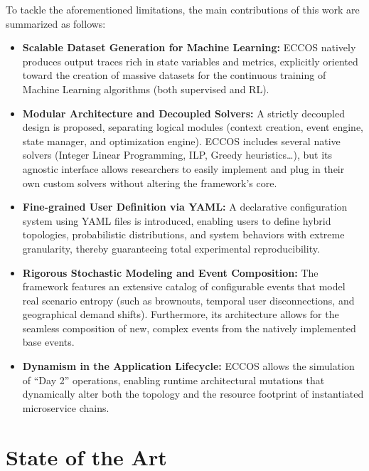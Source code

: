 \documentclass[ASNA]{USG} %
\begin{document}
To tackle the aforementioned limitations, the main contributions of this work are summarized as follows:

\begin{itemize}
    \item \textbf{Scalable Dataset Generation for Machine Learning:} ECCOS natively produces output traces rich in state variables and metrics, explicitly oriented toward the creation of massive datasets for the continuous training of Machine Learning algorithms (both supervised and RL).
    \item \textbf{Modular Architecture and Decoupled Solvers:} A strictly decoupled design is proposed, separating logical modules (context creation, event engine, state manager, and optimization engine). ECCOS includes several native solvers (Integer Linear Programming, ILP, Greedy heuristics\ldots), but its agnostic interface allows researchers to easily implement and plug in their own custom solvers without altering the framework's core.
    \item \textbf{Fine-grained User Definition via YAML:} A declarative configuration system using YAML files is introduced, enabling users to define hybrid topologies, probabilistic distributions, and system behaviors with extreme granularity, thereby guaranteeing total experimental reproducibility.
    \item \textbf{Rigorous Stochastic Modeling and Event Composition:} The framework features an extensive catalog of configurable events that model real scenario entropy (such as brownouts, temporal user disconnections, and geographical demand shifts). Furthermore, its architecture allows for the seamless composition of new, complex events from the natively implemented base events.
    \item \textbf{Dynamism in the Application Lifecycle:} ECCOS allows the simulation of ``Day 2'' operations, enabling runtime architectural mutations that dynamically alter both the topology and the resource footprint of instantiated microservice chains.
\end{itemize}


\section{State of the Art}
\end{document}
